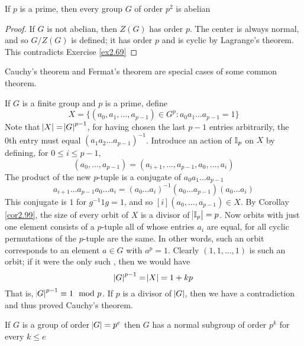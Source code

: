 \documentclass[11pt]{article}
\begin{document}
\begin{corollary}[]
If \(p\) is a prime, then every group \(G\) of order \(p^2\) is abelian
\end{corollary}
\begin{proof}
If \(G\) is not abelian, then \(Z(G)\) has order \(p\). The center is always normal, and
so \(G/Z(G)\) is defined; it has order \(p\) and is cyclic by Lagrange's theorem. 
This contradicts Exercise \ref{ex2.69}
\end{proof}

\begin{examplle}[]
Cauchy's theorem and Fermat's theorem are special cases of some common theorem.

If \(G\) is a finite group and \(p\) is a prime, define
\begin{equation*}
X=\{(a_0,a_1,\dots,a_{p-1})\in G^p:a_0a_1\dots a_{p-1}=1\}
\end{equation*}
Note that \(\abs{X}=\abs{G}^{p-1}\), for having chosen the last \(p-1\) entries
arbitrarily, the 0th entry must equal \((a_1a_2\dots a_{p-1})^{-1}\). Introduce an
action of \(\mathbb{I}_p\) on \(X\) by defining, for \(0\le i\le p-1\),
\begin{equation*}
[i](a_0,\dots,a_{p-1})=(a_{i+1},\dots,a_{p-1},a_0,\dots,a_i)
\end{equation*}
The product of the new \(p\)-tuple is a conjugate of \(a_0a_1\dots a_{p-1}\)
\begin{equation*}
a_{i+1}\dots a_{p-1}a_0\dots a_{i}=(a_0\dots a_i)^{-1}(a_0\dots a_{p-1})
(a_0\dots a_i)
\end{equation*}
This conjugate is \(1\) for \(g^{-1}1g=1\), and so \([i](a_0,\dots,a_{p-1})\in X\). By
Corollay \ref{cor2.99}, the size of every orbit of \(X\) is a divisor of
\(\abs{\mathbb{I}_p}=p\). Now orbits with just one element consists of a \(p\)-tuple all
of whose entries \(a_i\) are equal, for all cyclic permutations of the \(p\)-tuple
are the same. In other words, such an orbit corresponds to an element \(a\in G\)
with \(a^p=1\). Clearly \((1,1,\dots,1)\) is such an orbit; if it were the only such
, then we would have
\begin{equation*}
\abs{G}^{p-1}=\abs{X}=1+kp
\end{equation*}
That is, \(\abs{G}^{p-1}\equiv 1\mod p\). If \(p\) is a divisor of \(\abs{G}\), then
we have a contradiction and thus proved Cauchy's theorem.
\end{examplle}

\begin{proposition}[]
If \(G\) is a group of order \(\abs{G}=p^e\) then \(G\) has a normal subgroup of order
\(p^k\) for every \(k\le e\)
\end{proposition}
\end{document}

